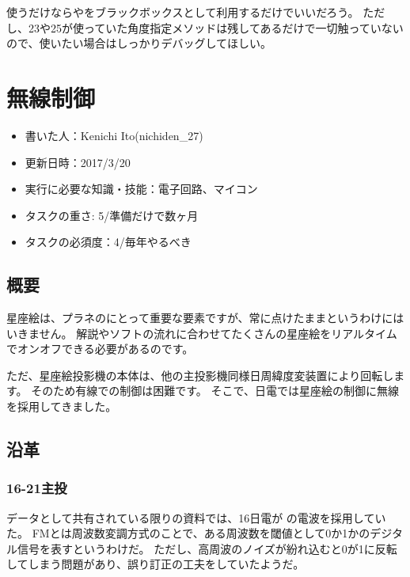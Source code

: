 \documentclass[letterpaper,10pt,dvipdfmx]{sphinxmanual}
\begin{document}
使うだけならやをブラックボックスとして利用するだけでいいだろう。
ただし、23や25が使っていた角度指定メソッドは残してあるだけで一切触っていないので、使いたい場合はしっかりデバッグしてほしい。


\chapter{無線制御}
\label{\detokenize{wireless/wireless::doc}}\label{\detokenize{wireless/wireless:id1}}\begin{itemize}
\item {} 
書いた人：Kenichi Ito(nichiden\_27)

\item {} 
更新日時：2017/3/20

\item {} 
実行に必要な知識・技能：電子回路、マイコン

\item {} 
タスクの重さ: 5/準備だけで数ヶ月

\item {} 
タスクの必須度：4/毎年やるべき

\end{itemize}


\section{概要}
\label{\detokenize{wireless/wireless:id2}}
星座絵は、プラネのにとって重要な要素ですが、常に点けたままというわけにはいきません。
解説やソフトの流れに合わせてたくさんの星座絵をリアルタイムでオンオフできる必要があるのです。

ただ、星座絵投影機の本体は、他の主投影機同様日周緯度変装置により回転します。
そのため有線での制御は困難です。
そこで、日電では星座絵の制御に無線を採用してきました。


\section{沿革}
\label{\detokenize{wireless/wireless:id3}}

\subsection{16-21主投}
\label{\detokenize{wireless/wireless:id4}}
データとして共有されている限りの資料では、16日電が
の電波を採用していた。
FMとは周波数変調方式のことで、ある周波数を閾値として0か1かのデジタル信号を表すというわけだ。
ただし、高周波のノイズが紛れ込むと0が1に反転してしまう問題があり、誤り訂正の工夫をしていたようだ。
\end{document}
